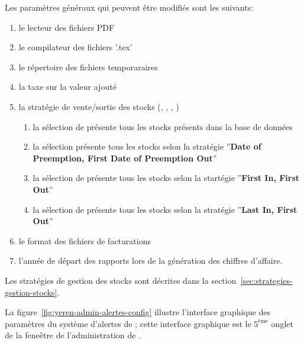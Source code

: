 Les param\`etres g\'en\'eraux qui peuvent \^etre
modifi\'es sont les suivants:
\begin{enumerate}[1)]
	\item le lecteur des fichiers PDF
	\item le compilateur des fichiers '.tex'
	\item le r\'epertoire des fichiers temporaraires
	\item la taxe sur la valeur ajout\'e
	\item la strat\'egie de vente/sortie des stocks (\cmup, \dpfdpo, \fifo, \lifo)
		\begin{enumerate}[1)]
			\item la s\'election de \cmup pr\'esente tous les
				stocks pr\'esents dans la base de donn\'ees \index{\cmup}
			\item la s\'election \dpfdpo pr\'esente tous les
				stocks selon la strat\'egie ''\textbf{Date of Preemption,
				First Date of Preemption Out}'' \index{\dpfdpo}				
			\item la s\'election de \fifo pr\'esente tous les
				stocks selon la start\'egie ''\textbf{First In, First Out}''
				\index{\fifo}
			\item la s\'election de \lifo pr\'esente tous les
				stocks selon la strat\'egie ''\textbf{Last In, First Out}''
				\index{\lifo}
		\end{enumerate}
	\item le format des fichiers de facturations
	\item l'ann\'ee de d\'epart des rapports lors de la
			g\'en\'eration des chiffres d'affaire.\\
\end{enumerate}

Les strat\'egies de gestion des stocks sont d\'ecrites
dans la section~\ref{sec:strategies-gestion-stocks}.


\newpage
{}

La figure~\ref{fig:yeren-admin-alertes-config} illustre
l'interface graphique des param\`etres du syst\`eme d'alertes
de \yeren; cette interface graphique est le $5^{\text{\`eme}}$
onglet de la fene\^etre de l'administration de \yeren.

